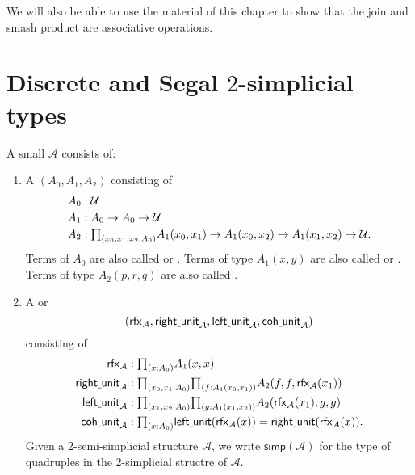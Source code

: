 We will also be able to use the material of this chapter to show that the join and smash product are associative operations. 

\section{Discrete and Segal \texorpdfstring{$2$}{2}-simplicial types}

\begin{defn}
A small  $\mathcal{A}$ consists of:
\begin{enumerate}
\item A  $(A_0,A_1,A_2)$ consisting of
\begin{align*}
A_0 & : \UU \\
A_1 & : A_0 \to A_0 \to \UU \\
A_2 & : \prd{x_0,x_1,x_2:A_0} A_1(x_0,x_1)\to A_1(x_0,x_2)\to A_1(x_1,x_2)\to\UU.
\end{align*}
Terms of $A_0$ are also called  or . Terms of type $A_1(x,y)$ are also called  or . Terms of type $A_2(p,r,q)$ are also called .
\item A  or 
\begin{equation*}
(\rfx{\mathcal{A}},\mathsf{right\usc{}unit}_{\mathcal{A}},\mathsf{left\usc{}unit}_{\mathcal{A}},\mathsf{coh\usc{}unit}_{\mathcal{A}})
\end{equation*}
consisting of
\begin{align*}
\rfx{\mathcal{A}} & : \prd{x:\pts{A}} \edg{A}(x,x) \\
\mathsf{right\usc{}unit}_{\mathcal{A}} & : \prd{x_0,x_1:A_0}{f:A_1(x_0,x_1)} A_2(f,f,\rfx{\mathcal{A}}(x_1)) \\
\mathsf{left\usc{}unit}_{\mathcal{A}} & : \prd{x_1,x_2:A_0}{g:A_1(x_1,x_2)} A_2(\rfx{\mathcal{A}}(x_1),g,g) \\
\mathsf{coh\usc{}unit}_{\mathcal{A}} & : \prd{x:A_0} \mathsf{left\usc{}unit}(\rfx{\mathcal{A}}(x))=\mathsf{right\usc{}unit}(\rfx{\mathcal{A}}(x)).
\end{align*}
Given a 2-semi-simplicial structure $\mathcal{A}$, we write $\mathsf{simp}(\mathcal{A})$ for the type of quadruples in the $2$-simplicial structre of $\mathcal{A}$.
\end{enumerate}
\end{defn}

